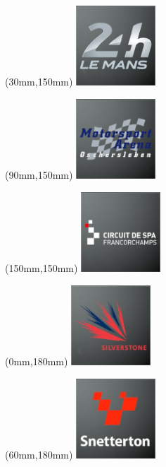 \begin{textblock*}{30mm}(30mm,150mm)%
\includegraphics[width=30mm]{LG/2015-05-20_00084.png}
\end{textblock*}
\begin{textblock*}{30mm}(90mm,150mm)%
\includegraphics[width=30mm]{LG/2015-05-20_00090.png}
\end{textblock*}
\begin{textblock*}{30mm}(150mm,150mm)%
\includegraphics[width=30mm]{LG/2015-05-20_00079.png}
\end{textblock*}
\begin{textblock*}{30mm}(0mm,180mm)%
\includegraphics[width=30mm]{LG/2015-05-20_00094.png}
\end{textblock*}
\begin{textblock*}{30mm}(60mm,180mm)%
\includegraphics[width=30mm]{LG/2015-05-20_00095.png}
\end{textblock*}
